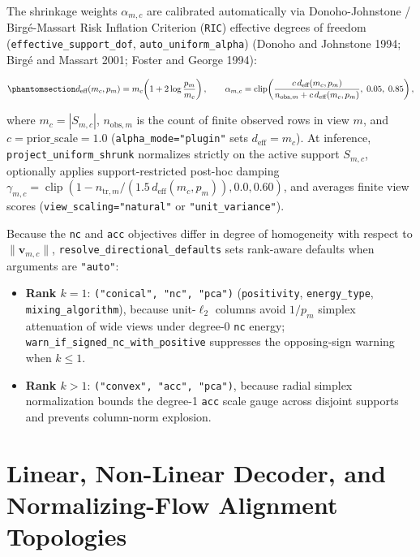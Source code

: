 \documentclass[
  10pt,
  letterpaper,
]{report}
\providecommand{\tightlist}{%
  \setlength{\itemsep}{0pt}\setlength{\parskip}{0pt}}
\begin{document}
The shrinkage weights \(\alpha_{m,c}\) are calibrated automatically via
Donoho-Johnstone / Birgé-Massart Risk Inflation Criterion (\texttt{RIC})
effective degrees of freedom (\texttt{effective\_support\_dof},
\texttt{auto\_uniform\_alpha}) (Donoho and Johnstone 1994; Birgé and
Massart 2001; Foster and George 1994):

\begin{equation}\protect\phantomsection\label{eq-ric-dof}{
d_{\text{eff}}(m_c, p_m) = m_c\!\left(1 + 2\log\frac{p_m}{m_c}\right), \qquad \alpha_{m,c} = \operatorname{clip}\!\left(\frac{c\,d_{\text{eff}}(m_c, p_m)}{n_{\text{obs},m} + c\,d_{\text{eff}}(m_c, p_m)},\; 0.05,\; 0.85\right),
}\end{equation}

where \(m_c = |S_{m,c}|\), \(n_{\text{obs},m}\) is the count of finite
observed rows in view \(m\), and \(c = \text{prior\_scale} = 1.0\)
(\texttt{alpha\_mode="plugin"} sets \(d_{\text{eff}} = m_c\)). At
inference, \texttt{project\_uniform\_shrunk} normalizes strictly on the
active support \(S_{m,c}\), optionally applies support-restricted
post-hoc damping
\(\gamma_{m,c} = \operatorname{clip}(1 - n_{\text{tr},m} / (1.5\,d_{\text{eff}}(m_c, p_m)), 0.0, 0.60)\),
and averages finite view scores (\texttt{view\_scaling="natural"} or
\texttt{"unit\_variance"}).

Because the \texttt{nc} and \texttt{acc} objectives differ in degree of
homogeneity with respect to \(\|\mathbf{v}_{m,c}\|\),
\texttt{resolve\_directional\_defaults} sets rank-aware defaults when
arguments are \texttt{"auto"}:

\begin{itemize}
\tightlist
\item
  \textbf{Rank \(k = 1\)}: \texttt{("conical",\ "nc",\ "pca")}
  (\texttt{positivity}, \texttt{energy\_type},
  \texttt{mixing\_algorithm}), because unit-\(\ell_2\) columns avoid
  \(1/p_m\) simplex attenuation of wide views under degree-0 \texttt{nc}
  energy; \texttt{warn\_if\_signed\_nc\_with\_positive} suppresses the
  opposing-sign warning when \(k \le 1\).
\item
  \textbf{Rank \(k > 1\)}: \texttt{("convex",\ "acc",\ "pca")}, because
  radial simplex normalization bounds the degree-1 \texttt{acc} scale
  gauge across disjoint supports and prevents column-norm explosion.
\end{itemize}

\section{Linear, Non-Linear Decoder, and Normalizing-Flow Alignment
Topologies}\label{linear-non-linear-decoder-and-normalizing-flow-alignment-topologies}
\end{document}
